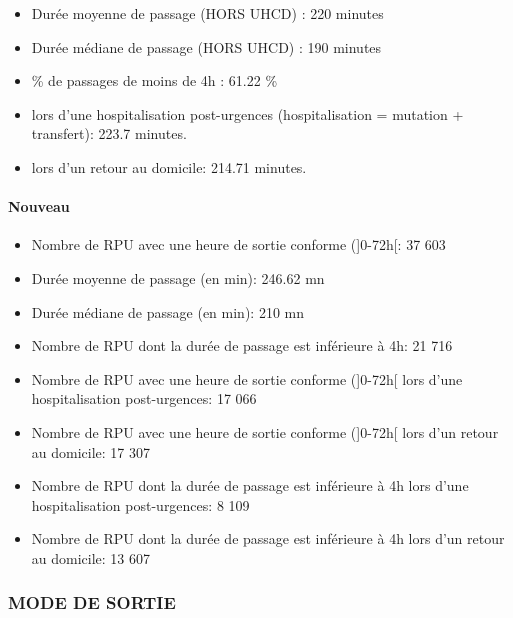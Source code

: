 \documentclass[]{article}
\begin{document}
\begin{itemize}
\itemsep1pt\parskip0pt
\item
  Durée moyenne de passage (HORS UHCD) : 220 minutes
\item
  Durée médiane de passage (HORS UHCD) : 190 minutes
\item
  \% de passages de moins de 4h : 61.22 \%
\item
  lors d'une hospitalisation post-urgences (hospitalisation = mutation +
  transfert): 223.7 minutes.
\item
  lors d'un retour au domicile: 214.71 minutes.
\end{itemize}

\paragraph{Nouveau}\label{nouveau}

\begin{itemize}
\item
  Nombre de RPU avec une heure de sortie conforme ({]}0-72h{[}: 37 603
\item
  Durée moyenne de passage (en min): 246.62 mn
\item
  Durée médiane de passage (en min): 210 mn
\item
  Nombre de RPU dont la durée de passage est inférieure à 4h: 21 716
\item
  Nombre de RPU avec une heure de sortie conforme ({]}0-72h{[} lors
  d'une hospitalisation post-urgences: 17 066
\item
  Nombre de RPU avec une heure de sortie conforme ({]}0-72h{[} lors d'un
  retour au domicile: 17 307
\item
  Nombre de RPU dont la durée de passage est inférieure à 4h lors d'une
  hospitalisation post-urgences: 8 109
\item
  Nombre de RPU dont la durée de passage est inférieure à 4h lors d'un
  retour au domicile: 13 607
\end{itemize}

\subsubsection{MODE DE SORTIE}\label{mode-de-sortie-1}
\end{document}
